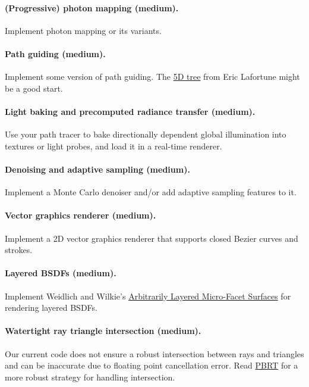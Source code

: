 \paragraph{(Progressive) photon mapping (medium).}
Implement photon mapping or its variants.

\paragraph{Path guiding (medium).}
Implement some version of path guiding. The \href{https://graphics.cs.kuleuven.be/publications/A5TTRTVOMCRT/index.html}{5D tree} from Eric Lafortune might be a good start.

\paragraph{Light baking and precomputed radiance transfer (medium).}
Use your path tracer to bake directionally dependent global illumination into textures or light probes, and load it in a real-time renderer.

\paragraph{Denoising and adaptive sampling (medium).}
Implement a Monte Carlo denoiser and/or add adaptive sampling features to it.

\paragraph{Vector graphics renderer (medium).}
Implement a 2D vector graphics renderer that supports closed Bezier curves and strokes.

\paragraph{Layered BSDFs (medium).}
Implement Weidlich and Wilkie's \href{https://www.cg.tuwien.ac.at/research/publications/2007/weidlich_2007_almfs/weidlich_2007_almfs-paper.pdf}{Arbitrarily Layered Micro-Facet Surfaces} for rendering layered BSDFs.

\paragraph{Watertight ray triangle intersection (medium).}
Our current code does not ensure a robust intersection between rays and triangles and can be inaccurate due to floating point cancellation error. Read \href{https://www.pbr-book.org/3ed-2018/Shapes/Managing_Rounding_Error}{PBRT} for a more robust strategy for handling intersection.

